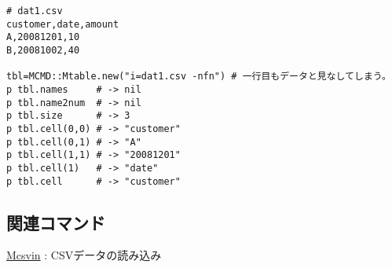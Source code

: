 \begin{Verbatim}[baselinestretch=0.7,frame=single]
# dat1.csv
customer,date,amount
A,20081201,10
B,20081002,40

tbl=MCMD::Mtable.new("i=dat1.csv -nfn") # 一行目もデータと見なしてしまう。
p tbl.names     # -> nil
p tbl.name2num  # -> nil
p tbl.size      # -> 3
p tbl.cell(0,0) # -> "customer"
p tbl.cell(0,1) # -> "A"
p tbl.cell(1,1) # -> "20081201"
p tbl.cell(1)   # -> "date"
p tbl.cell      # -> "customer"
\end{Verbatim}

\subsection{関連コマンド}
\hyperref[sect:mcsvinRB]{Mcsvin} : CSVデータの読み込み

%

